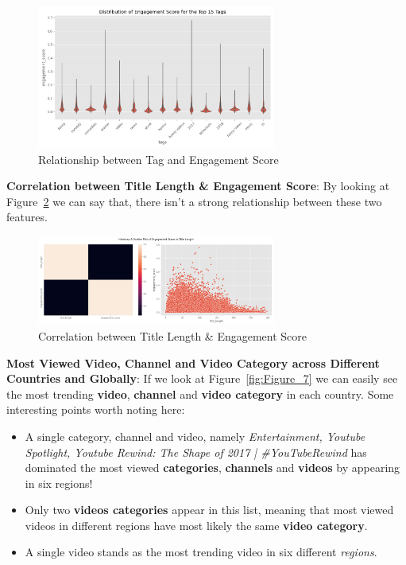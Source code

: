 \documentclass[a4paper,12pt]{article}
\begin{document}
\begin{figure}[H]
    \centering
    \includegraphics[width=0.7\textwidth]{./images/distro_of_eng_for_top_15_common_tags.png}
    \caption{Relationship between Tag and Engagement Score}
    \label{fig:Figure_5}
\end{figure}


\noindent \textbf{Correlation between Title Length \& Engagement Score}: By looking at Figure~\ref{fig:Figure_6} we can say that, there isn't a strong relationship between these two features.

\begin{figure}[H]
    \centering
    \includegraphics[width=0.7\textwidth]{./images/heatmap_and_scatter_plot_of_eng_vs_title_len.png}
    \caption{Correlation between Title Length \& Engagement Score}
    \label{fig:Figure_6}
\end{figure}


\noindent \textbf{Most Viewed Video, Channel and Video Category across Different Countries and Globally}: If we look at Figure~\ref{fig:Figure_7} we can easily see the most trending \textbf{video}, \textbf{channel} and \textbf{video category} in each country.
Some interesting points worth noting here: 
\begin{itemize}
    \item A single category, channel and video, namely \textit{Entertainment, Youtube Spotlight, Youtube Rewind: The Shape of 2017 | \#YouTubeRewind} has dominated the most viewed \textbf{categories}, 
    \textbf{channels} and \textbf{videos} by appearing in six regions!
    \item Only two \textbf{videos categories} appear in this list, meaning that most viewed videos in different regions have most likely the same \textbf{video category}.
    \item A single video stands as the most trending video in six different \textit{regions}.
\end{itemize}
\end{document}
